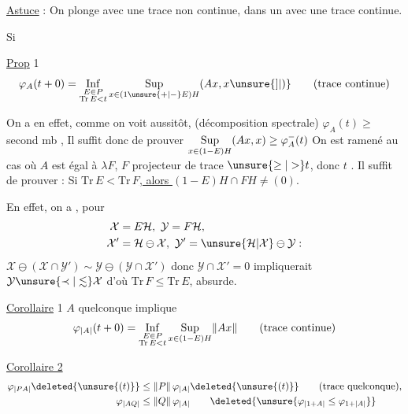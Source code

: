 
\uline{Astuce} : On plonge   avec une trace non continue, dans un  avec une trace continue.

Si 

\uline{Prop} 1
\[
\varphi_A(t+0)=\mathop{\rm Inf}\limits_{\substack{E\in P\\\mathrm{Tr}\,E<t}}
\mathop{\rm Sup}\limits_{x\in(1\unsure{+|-}E)H}(Ax,x\unsure{]|)}
\qquad\text{(trace continue)}
\]

 On a en effet, comme on voit aussitôt, (décomposition spectrale) $\varphi_A(t)\geq$ second mb , Il suffit donc de prouver $\mathop{\rm Sup}\limits_{x\in(1-E)H}(Ax,x)\geq\varphi^-_A(t)$  On est ramené au cas où $A$ est égal à $\lambda F$, $F$ projecteur de trace $\unsure{\geq|>}t$, donc  $t$  \unsure{$=$}.   Il suffit de prouver : Si \uline{$\mathrm{Tr}\,E<\mathrm{Tr}\,F$, alors $(1-E)H\cap FH\neq(0)$}.

En effet, on a , pour
\[
\begin{aligned}
\mathcal X&=E\mathcal H,\ \mathcal Y=F\mathcal H,\\
\mathcal X'&=\mathcal H\ominus\mathcal X,\ \mathcal Y'=\unsure{\mathcal H|\mathcal X}\ominus\mathcal Y :
\end{aligned}
\]
$\mathcal X\ominus(\mathcal X\cap\mathcal Y')\sim\mathcal Y\ominus(\mathcal Y\cap\mathcal X')$ donc $\mathcal Y\cap\mathcal X'=0$ impliquerait  $\mathcal Y\unsure{\prec|\lesssim}\mathcal X$ d'où $\mathrm{Tr}\,F\leq\mathrm{Tr}\,E$, absurde.

\uline{Corollaire} 1 $A$ quelconque implique
\[
\varphi_{\lvert A\rvert}(t+0)=\mathop{\rm Inf}\limits_{\substack{E\in P\\\mathrm{Tr}\,E<t}}
\mathop{\rm Sup}\limits_{x\in(1-E)H}\lVert Ax\rVert\qquad\text{(trace continue)}
\]

\uline{Corollaire 2}
\[
\begin{aligned}
\varphi_{\lvert PA\rvert}\deleted{\unsure{(t)}}&\leq\lVert P\rVert\,\varphi_{\lvert A\rvert}\deleted{\unsure{(t)}}\qquad\text{(trace quelconque),}\\
\varphi_{\lvert AQ\rvert}&\leq\lVert Q\rVert\,\varphi_{\lvert A\rvert}\qquad\deleted{\unsure{\varphi_{\lvert1+A\rvert}\leq\varphi_{1+\lvert A\rvert}}}
\end{aligned}
\]

